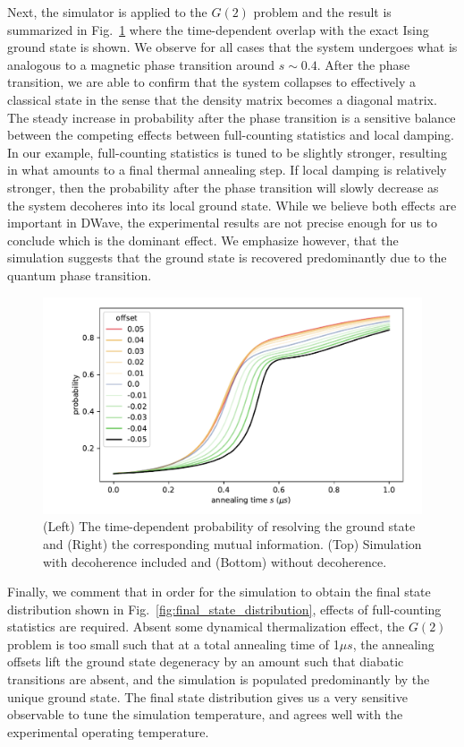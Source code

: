 \documentclass[prd,twocolumn,tightenlines,preprintnumbers,showpacs,superscriptaddress,notitlepage,nofootinbib,eqsecnum,
floatfix,longbibliography,aps,10pt]{revtex4-2}
\begin{document}
Next, the simulator is applied to the $G(2)$ problem and the result is summarized in Fig.~\ref{fig:td_prob} where the time-dependent overlap with the exact Ising ground state is shown. We observe for all cases that the system undergoes what is analogous to a magnetic phase transition around $s\sim 0.4$. After the phase transition, we are able to confirm that the system collapses to effectively a classical state in the sense that the density matrix becomes a diagonal matrix. The steady increase in probability after the phase transition is a sensitive balance between the competing effects between full-counting statistics and local damping. In our example, full-counting statistics is tuned to be slightly stronger, resulting in what amounts to a final thermal annealing step. If local damping is relatively stronger, then the probability after the phase transition will slowly decrease as the system decoheres into its local ground state. While we believe both effects are important in DWave, the experimental results are not precise enough for us to conclude which is the dominant effect. We emphasize however, that the simulation suggests that the ground state is recovered predominantly due to the quantum phase transition.

\begin{figure}
	\centering
	\includegraphics[width=\columnwidth]{./new_figures/time_dependent_probability.pdf}
	\caption{(Left) The time-dependent probability of resolving the ground state and (Right) the corresponding mutual information. (Top) Simulation with decoherence included and (Bottom) without decoherence.}
	\label{fig:td_prob}
\end{figure}

Finally, we comment that in order for the simulation to obtain the final state distribution shown in Fig.~\ref{fig:final_state_distribution}, effects of full-counting statistics are required. Absent some dynamical thermalization effect, the $G(2)$ problem is too small such that at a total annealing time of 1$\mu s$, the annealing offsets lift the ground state degeneracy by an amount such that diabatic transitions are absent, and the simulation is populated predominantly by the unique ground state. The final state distribution gives us a very sensitive observable to tune the simulation temperature, and agrees well with the experimental operating temperature.
\end{document}
